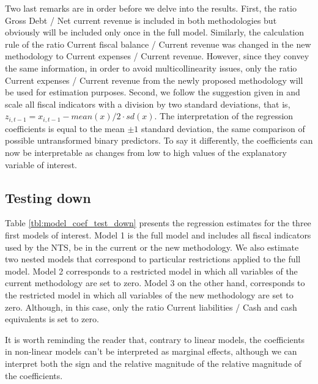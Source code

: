 Two last remarks are in order before we delve into the results. First, the ratio Gross Debt / Net current revenue is included in both methodologies but obviously will be included only once in the full model. Similarly, the calculation rule of the ratio Current fiscal balance / Current revenue was changed in the new methodology to Current expenses / Current revenue. However, since they convey the same information, in order to avoid multicollinearity issues, only the ratio Current expenses / Current revenue from the newly proposed methodology will be used for estimation purposes. Second, we follow the suggestion given in \citet{gelman2008} and scale all fiscal indicators with a division by two standard deviations, that is, $z_{i,t-1} = x_{i, t-1} - mean(x) / 2 \cdot sd(x)$. The interpretation of the regression coefficients is equal to the mean $\pm 1$ standard deviation, the same comparison of possible untransformed binary predictors. To say it differently, the coefficients can now be interpretable as changes from low to high values of the explanatory variable of interest.

\subsection*{Testing down}

Table \ref{tbl:model_coef_test_down} presents the regression estimates for the three first models of interest. Model 1 is the full model and includes all fiscal indicators used by the NTS, be in the current or the new methodology. We also estimate two nested models that correspond to particular restrictions applied to the full model. Model 2 corresponds to a restricted model in which all variables of the current methodology are set to zero. Model 3 on the other hand, corresponds to the restricted model in which all variables of the new methodology are set to zero. Although, in this case, only the ratio Current liabilities / Cash and cash equivalents is set to zero.

It is worth reminding the reader that, contrary to linear models, the coefficients in non-linear models can't be interpreted as marginal effects, although we can interpret both the sign and the relative magnitude of the relative magnitude of the coefficients. 

